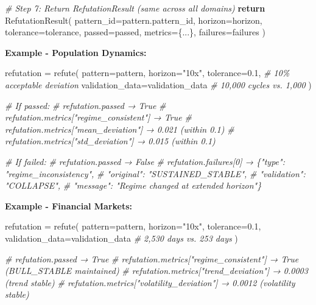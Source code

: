 \documentclass[
]{article}
\newenvironment{Shaded}{}{}
\newcommand{\CommentTok}[1]{\textcolor[rgb]{0.38,0.63,0.69}{\textit{#1}}}
\newcommand{\ControlFlowTok}[1]{\textcolor[rgb]{0.00,0.44,0.13}{\textbf{#1}}}
\newcommand{\FloatTok}[1]{\textcolor[rgb]{0.25,0.63,0.44}{#1}}
\newcommand{\NormalTok}[1]{#1}
\newcommand{\OperatorTok}[1]{\textcolor[rgb]{0.40,0.40,0.40}{#1}}
\newcommand{\StringTok}[1]{\textcolor[rgb]{0.25,0.44,0.63}{#1}}
\begin{document}
\begin{Shaded}
\begin{Highlighting}[]
    \CommentTok{\# Step 7: Return RefutationResult (same across all domains)}
    \ControlFlowTok{return}\NormalTok{ RefutationResult(}
\NormalTok{        pattern\_id}\OperatorTok{=}\NormalTok{pattern.pattern\_id,}
\NormalTok{        horizon}\OperatorTok{=}\NormalTok{horizon,}
\NormalTok{        tolerance}\OperatorTok{=}\NormalTok{tolerance,}
\NormalTok{        passed}\OperatorTok{=}\NormalTok{passed,}
\NormalTok{        metrics}\OperatorTok{=}\NormalTok{\{...\},}
\NormalTok{        failures}\OperatorTok{=}\NormalTok{failures}
\NormalTok{    )}
\end{Highlighting}
\end{Shaded}

\textbf{Example - Population Dynamics:}

\begin{Shaded}
\begin{Highlighting}[]
\NormalTok{refutation }\OperatorTok{=}\NormalTok{ refute(}
\NormalTok{    pattern}\OperatorTok{=}\NormalTok{pattern,}
\NormalTok{    horizon}\OperatorTok{=}\StringTok{"10x"}\NormalTok{,}
\NormalTok{    tolerance}\OperatorTok{=}\FloatTok{0.1}\NormalTok{,  }\CommentTok{\# 10\% acceptable deviation}
\NormalTok{    validation\_data}\OperatorTok{=}\NormalTok{validation\_data  }\CommentTok{\# 10,000 cycles vs. 1,000}
\NormalTok{)}

\CommentTok{\# If passed:}
\CommentTok{\# refutation.passed → True}
\CommentTok{\# refutation.metrics["regime\_consistent"] → True}
\CommentTok{\# refutation.metrics["mean\_deviation"] → 0.021 (within 0.1)}
\CommentTok{\# refutation.metrics["std\_deviation"] → 0.015 (within 0.1)}

\CommentTok{\# If failed:}
\CommentTok{\# refutation.passed → False}
\CommentTok{\# refutation.failures[0] → \{"type": "regime\_inconsistency",}
\CommentTok{\#                           "original": "SUSTAINED\_STABLE",}
\CommentTok{\#                           "validation": "COLLAPSE",}
\CommentTok{\#                           "message": "Regime changed at extended horizon"\}}
\end{Highlighting}
\end{Shaded}

\textbf{Example - Financial Markets:}

\begin{Shaded}
\begin{Highlighting}[]
\NormalTok{refutation }\OperatorTok{=}\NormalTok{ refute(}
\NormalTok{    pattern}\OperatorTok{=}\NormalTok{pattern,}
\NormalTok{    horizon}\OperatorTok{=}\StringTok{"10x"}\NormalTok{,}
\NormalTok{    tolerance}\OperatorTok{=}\FloatTok{0.1}\NormalTok{,}
\NormalTok{    validation\_data}\OperatorTok{=}\NormalTok{validation\_data  }\CommentTok{\# 2,530 days vs. 253 days}
\NormalTok{)}

\CommentTok{\# refutation.passed → True}
\CommentTok{\# refutation.metrics["regime\_consistent"] → True (BULL\_STABLE maintained)}
\CommentTok{\# refutation.metrics["trend\_deviation"] → 0.0003 (trend stable)}
\CommentTok{\# refutation.metrics["volatility\_deviation"] → 0.0012 (volatility stable)}
\end{Highlighting}
\end{Shaded}
\end{document}
